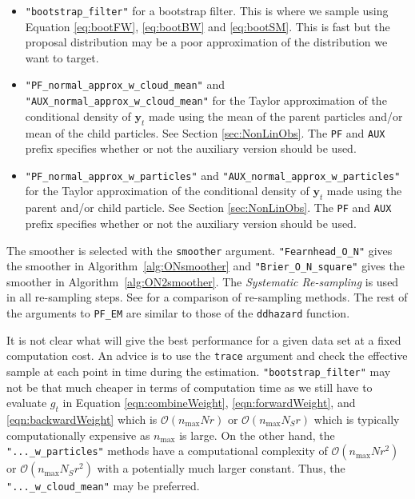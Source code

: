 \documentclass[notitlepage]{article}
\renewcommand{\vec}[1]{\bm{#1}}
\newcommand{\Lparen}[1]{\left( #1\right)}
\newcommand{\bigO}[1]{\mathcal{O}\Lparen{#1}}
\newcommand{\dimRng}{r}
\newcommand{\nPart}{N}
\newcommand{\nMax}{n_{\text{max}}}
\begin{document}
\begin{itemize}
	\item \texttt{"bootstrap\_filter"} for a bootstrap filter. This is where we sample using 
	Equation \eqref{eq:bootFW}, \eqref{eq:bootBW} and \eqref{eq:bootSM}. This is fast but the proposal 
	distribution may be a poor approximation of the distribution we want to target.
	\item \texttt{"PF\_normal\_approx\_w\_cloud\_mean"} and \texttt{"AUX\_normal\_approx\_w\_cloud\_mean"} for 
	the Taylor approximation of the conditional density of $\vec{y}_t$ made using the mean of the parent 
	particles and/or mean of the child particles. See Section \ref{sec:NonLinObs}. 
	The \texttt{PF} and \texttt{AUX} prefix specifies whether or not the auxiliary version 
	should be used.
	\item \texttt{"PF\_normal\_approx\_w\_particles"} and 
	 \texttt{"AUX\_normal\_approx\_w\_particles"} for the Taylor approximation of the conditional density 
	 of $\vec{y}_t$ made using the parent and/or child particle. 
	  See Section \ref{sec:NonLinObs}.
	  The \texttt{PF} and \texttt{AUX} prefix specifies whether or not the auxiliary version should be used.
\end{itemize}

The smoother is selected with the \texttt{smoother} argument. \texttt{"Fearnhead\_O\_N"} gives the smoother in Algorithm~\ref{alg:ONsmoother} and \texttt{"Brier\_O\_N\_square"} gives the smoother in Algorithm~\ref{alg:ON2smoother}. 
The \emph{Systematic Re-sampling} \citep{kitagawa96} is used in all re-sampling steps. See \cite{douc05} for a 
comparison of re-sampling methods. The rest of the arguments to \texttt{PF\_EM} are similar to those of the 
\texttt{ddhazard} function.

It is not clear what will give the best performance for a given data set
at a fixed computation cost. An advice is to use the \texttt{trace}
argument and check the effective sample at each point in time during the estimation. \texttt{"bootstrap\_filter"}
may not be that much cheaper in terms of computation time as we still have to evaluate $g_t$ in Equation
\eqref{eqn:combineWeight}, \eqref{eqn:forwardWeight}, and \eqref{eqn:backwardWeight} which is 
$\bigO{\nMax\nPart\dimRng}$ or $\bigO{\nMax\nPart_S\dimRng}$ 
which is typically computationally expensive as $\nMax$ is large. 
On the other hand, the \texttt{"...\_w\_particles"}
methods have a computational complexity of $\bigO{\nMax\nPart\dimRng^2}$ or $\bigO{\nMax\nPart_S\dimRng^2}$ 
with a potentially much larger constant. 
Thus, the \texttt{"...\_w\_cloud\_mean"} may be preferred.
\end{document}
